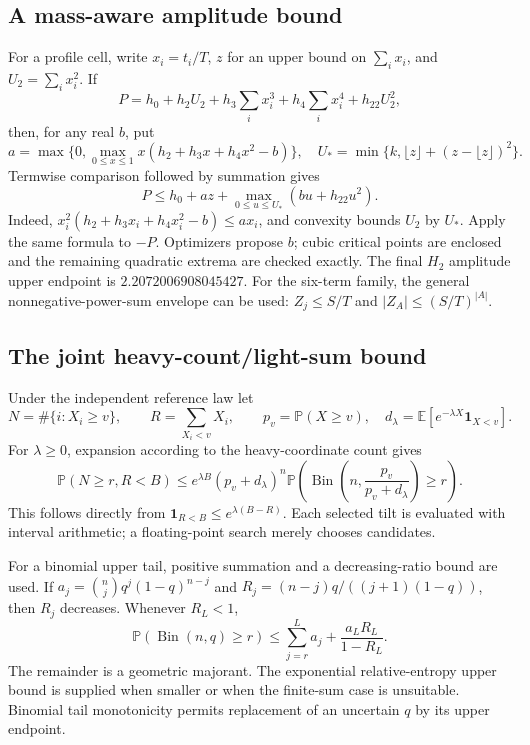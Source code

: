 \documentclass[11pt,a4paper]{article}
\theoremstyle{definition}\newtheorem{definition}[theorem]{Definition}
\theoremstyle{remark}\newtheorem{remark}[theorem]{Remark}
\newcommand{\E}{\mathbb E}\newcommand{\Prob}{\mathbb P}
\newcommand{\ind}{\mathbf 1}\newcommand{\dd}{\,d}
\numberwithin{equation}{section}
\begin{document}
\subsection{A mass-aware amplitude bound}
For a profile cell, write $x_i=t_i/T$, $z$ for an upper bound on $\sum_i x_i$, and $U_2=\sum_i x_i^2$. If
\[
 P=h_0+h_2U_2+h_3\sum_i x_i^3+h_4\sum_i x_i^4+h_{22}U_2^2,
\]
then, for any real $b$, put
\[
 a=\max\{0,\max_{0\le x\le1}x(h_2+h_3x+h_4x^2-b)\},\quad
 U_* =\min\{k,\lfloor z\rfloor+(z-\lfloor z\rfloor)^2\}.
\]
Termwise comparison followed by summation gives
\begin{equation}\label{eq:amplitude}
 P\le h_0+az+\max_{0\le u\le U_*}(bu+h_{22}u^2).
\end{equation}
Indeed, $x_i^2(h_2+h_3x_i+h_4x_i^2-b)\le ax_i$, and convexity bounds $U_2$ by $U_*$. Apply the same formula to $-P$. Optimizers propose $b$; cubic critical points are enclosed and the remaining quadratic extrema are checked exactly. The final $H_2$ amplitude upper endpoint is $2.2072006908045427$. For the six-term family, the general nonnegative-power-sum envelope can be used: $Z_j\le S/T$ and $|Z_A|\le(S/T)^{|A|}$.

\subsection{The joint heavy-count/light-sum bound}
Under the independent reference law let
\[
 N=\#\{i:X_i\ge v\},\qquad R=\sum_{X_i<v}X_i,\qquad
 p_v=\Prob(X\ge v),\quad d_\lambda=\E[e^{-\lambda X}\ind_{X<v}].
\]
For $\lambda\ge0$, expansion according to the heavy-coordinate count gives
\begin{equation}\label{eq:joint}
 \Prob(N\ge r,R<B)\le
 e^{\lambda B}(p_v+d_\lambda)^n
 \Prob\left(\operatorname{Bin}\left(n,\frac{p_v}{p_v+d_\lambda}\right)\ge r\right).
\end{equation}
This follows directly from $\ind_{R<B}\le e^{\lambda(B-R)}$. Each selected tilt is evaluated with interval arithmetic; a floating-point search merely chooses candidates.

For a binomial upper tail, positive summation and a decreasing-ratio bound are used. If
$a_j=\binom nj q^j(1-q)^{n-j}$ and
$R_j=(n-j)q/((j+1)(1-q))$, then $R_j$ decreases. Whenever $R_L<1$,
\begin{equation}\label{eq:binomial}
 \Prob(\operatorname{Bin}(n,q)\ge r)
 \le\sum_{j=r}^{L}a_j+\frac{a_LR_L}{1-R_L}.
\end{equation}
The remainder is a geometric majorant. The exponential relative-entropy upper bound is supplied when smaller or when the finite-sum case is unsuitable. Binomial tail monotonicity permits replacement of an uncertain $q$ by its upper endpoint.
\end{document}
